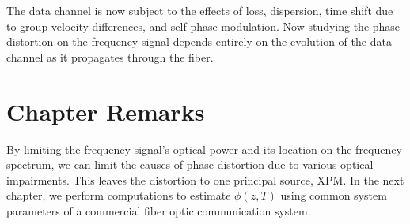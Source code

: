 The data channel is now subject to the effects of loss, dispersion, time shift due to group velocity differences, and self-phase modulation. Now studying the phase distortion on the frequency signal depends entirely on the evolution of the data channel as it propagates through the fiber.

\section{Chapter Remarks} \label{sec:3conc}

By limiting the frequency signal's optical power and its location on the frequency spectrum, we can limit the causes of phase distortion due to various optical impairments. This leaves the distortion to one principal source, XPM. In the next chapter, we perform computations to estimate $\phi(z,T)$ using common system parameters of a commercial fiber optic communication system.